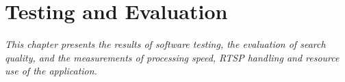 \chapter{Testing and Evaluation}
\label{chapter:kiemthu}

\textit{This chapter presents the results of software testing, the evaluation of search quality, and the measurements of processing speed, RTSP handling and resource use of the application.}




